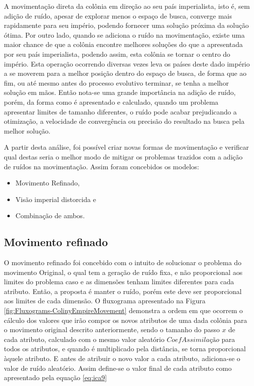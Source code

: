 A movimentação direta da colônia em direção ao seu país imperialista, isto é, sem adição de ruído, apesar de explorar menos o espaço de busca, converge mais rapidamente para seu império, podendo fornecer uma solução próxima da solução ótima. Por outro lado, quando se adiciona o ruído na movimentação, existe uma maior chance de que a colônia encontre melhores soluções do que a apresentada por seu país imperialista, podendo assim, esta colônia se tornar o centro do império. Esta operação ocorrendo diversas vezes leva os países deste dado império a se moverem para a melhor posição dentro do espaço de busca, de forma que ao fim, ou até mesmo antes do processo evolutivo terminar, se tenha a melhor solução em mãos. Então nota-se uma grande importância na adição de ruído, porém, da forma como é apresentado e calculado, quando um problema apresentar limites de tamanho diferentes, o ruído pode acabar prejudicando a otimização, a velocidade de convergência ou precisão do resultado na busca pela melhor solução.

A partir desta análise, foi possível criar novas formas de movimentação e verificar qual destas seria o melhor modo de mitigar os problemas trazidos com a adição de ruídos na movimentação. Assim foram concebidos os modelos:
\begin{itemize}
\item Movimento Refinado,
\item Visão imperial distorcida e 
\item Combinação de ambos.
\end{itemize}







\subsection{Movimento refinado}
\label{Movimento refinado}

O movimento refinado foi concebido com o intuito de solucionar o problema do movimento Original, o qual tem a geração de ruído fixa, e não proporcional aos limites do problema caso e as dimensões tenham limites diferentes para cada atributo. Então, a proposta é manter o ruído, porém este deve ser proporcional aos limites de cada dimensão. O fluxograma apresentado na Figura \ref{fig:Fluxograms-ColinyEmpireMovement} demonstra a ordem em que ocorrem o cálculo dos valores que irão compor os novos atributos de uma dada colônia para o movimento original descrito anteriormente, sendo o tamanho do passo \(x\) de cada atributo, calculado com o mesmo valor aleatório \(CoefAssimilação\) para todos os atributos, e quando é multiplicado pela distância, se torna proporcional àquele atributo. E antes de atribuir o novo valor a cada atributo, adiciona-se o valor de ruído aleatório. Assim define-se o valor final de cada atributo como apresentado pela equação \ref{eq:ica9}
	

